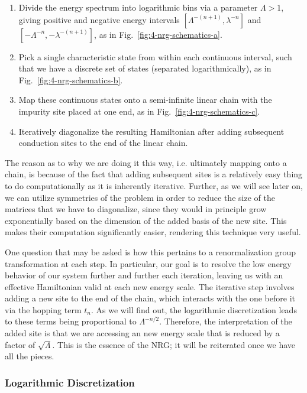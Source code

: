\begin{enumerate}
\item Divide the energy spectrum into logarithmic bins via a parameter $\Lambda > 1$, giving positive and negative energy intervals $[\Lambda^{-(n+1)},\lambda^{-n}]$ and $[-\Lambda^{-n},-\lambda^{-(n+1)}]$, as in Fig.~\ref{fig:4-nrg-schematics-a}.
\item Pick a single characteristic state from within each continuous interval, such that we have a discrete set of states (separated logarithmically), as in Fig.~\ref{fig:4-nrg-schematics-b}.
\item Map these continuous states onto a semi-infinite linear chain with the impurity site placed at one end, as in Fig.~\ref{fig:4-nrg-schematics-c}.
\item Iteratively diagonalize the resulting Hamiltonian after adding subsequent conduction sites to the end of the linear chain.
\end{enumerate}



The reason as to why we are doing it this way, i.e. ultimately mapping onto a chain, is because of the fact that adding subsequent sites is a relatively easy thing to do computationally as it is inherently iterative. Further, as we will see later on, we can utilize symmetries of the problem in order to reduce the size of the matrices that we have to diagonalize, since they would in principle grow exponentially based on the dimension of the added basis of the new site. This makes their computation significantly easier, rendering this technique very useful.

One question that may be asked is how this pertains to a renormalization group transformation at each step. In particular, our goal is to resolve the low energy behavior of our system further and further each iteration, leaving us with an effective Hamiltonian valid at each new energy scale. The iterative step involves adding a new site to the end of the chain, which interacts with the one before it via the hopping term $t_n$. As we will find out, the logarithmic discretization leads to these terms being proportional to $\Lambda^{-n/2}$. Therefore, the interpretation of the added site is that we are accessing an new energy scale that is reduced by a factor of $\sqrt{\Lambda}$. This is the essence of the NRG; it will be reiterated once we have all the pieces.



\subsubsection{Logarithmic Discretization}

